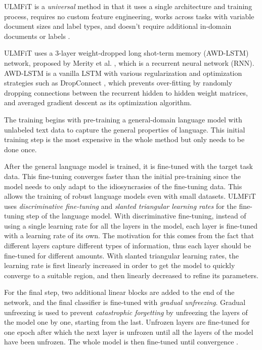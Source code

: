 ULMFiT is a \textit{universal} method in that it uses a single architecture and training process, requires no custom feature engineering, works across tasks with variable document sizes and label types, and doesn't require additional in-domain documents or labels \cite{howard2018}.

ULMFiT uses a 3-layer weight-dropped long shot-term memory (AWD-LSTM) network, proposed by Merity et al. \cite{merity2017}, which is a recurrent neural network (RNN).
AWD-LSTM is a vanilla LSTM with various regularization and optimization strategies such as DropConnect \cite{wan}, which prevents over-fitting by randomly dropping connections between the recurrent hidden to hidden weight matrices, and averaged gradient descent as its optimization algorithm.

The training begins with pre-training a general-domain language model with unlabeled text data to capture the general properties of language.
This initial training step is the most expensive in the whole method but only needs to be done once.

After the general language model is trained, it is fine-tuned with the target task data.
This fine-tuning converges faster than the initial pre-training since the model needs to only adapt to the idiosyncrasies of the fine-tuning data.
This allows the training of robust language models even with small datasets.
ULMFiT uses \textit{discriminative fine-tuning} and \textit{slanted triangular learning rates} for the fine-tuning step of the language model.
With discriminative fine-tuning, instead of using a single learning rate for all the layers in the model, each layer is fine-tuned with a learning rate of its own.
The motivation for this comes from the fact that different layers capture different types of information, thus each layer should be fine-tuned for different amounts.
With slanted triangular learning rates, the learning rate is first linearly increased in order to get the model to quickly converge to a suitable region, and then linearly decreased to refine its parameters.

For the final step, two additional linear blocks are added to the end of the network, and the final classifier is fine-tuned with \textit{gradual unfreezing}.
Gradual unfreezing is used to prevent \textit{catastrophic forgetting} by unfreezing the layers of the model one by one, starting from the last.
Unfrozen layers are fine-tuned for one epoch after which the next layer is unfrozen until all the layers of the model have been unfrozen.
The whole model is then fine-tuned until convergence \cite{howard2018}.


